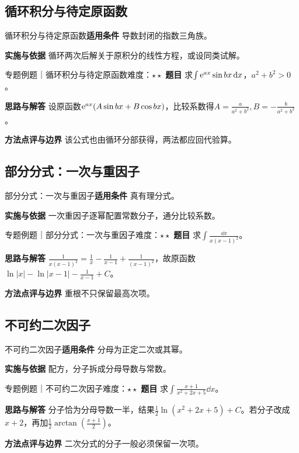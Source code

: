\subsection{循环积分与待定原函数}\label{mat:integrals_methods:i07}
\begin{method}{循环积分与待定原函数}\textbf{适用条件} 导数封闭的指数三角族。\par\textbf{实施与依据} 循环两次后解关于原积分的线性方程，或设同类试解。\end{method}
\begin{example}{专题例题｜循环积分与待定原函数}{难度：$\star\star$}
\textbf{题目} 求$\int\mathrm{e}^{ax}\sin bx\mathop{}\!\mathrm{d} x$，$a^2+b^2>0$。\par\textbf{思路与解答} 设原函数$\mathrm{e}^{ax}(A\sin bx+B\cos bx)$，比较系数得$A=\frac{a}{a^2+b^2},B=-\frac{b}{a^2+b^2}$。\par\textbf{方法点评与边界} 该公式也由循环分部获得，两法都应回代验算。
\end{example}
\subsection{部分分式：一次与重因子}\label{mat:integrals_methods:i08}
\begin{method}{部分分式：一次与重因子}\textbf{适用条件} 真有理分式。\par\textbf{实施与依据} 一次重因子逐幂配置常数分子，通分比较系数。\end{method}
\begin{example}{专题例题｜部分分式：一次与重因子}{难度：$\star\star$}
\textbf{题目} 求$\int\frac{\dd x}{x(x-1)^2}$。\par\textbf{思路与解答} $\frac{1}{x(x-1)^2}=\frac{1}{x}-\frac{1}{x-1}+\frac{1}{(x-1)^2}$，故原函数$\ln|x|-\ln|x-1|-\frac{1}{x-1}+C$。\par\textbf{方法点评与边界} 重根不只保留最高次项。
\end{example}
\subsection{不可约二次因子}\label{mat:integrals_methods:i09}
\begin{method}{不可约二次因子}\textbf{适用条件} 分母为正定二次或其幂。\par\textbf{实施与依据} 配方，分子拆成分母导数与常数。\end{method}
\begin{example}{专题例题｜不可约二次因子}{难度：$\star\star$}
\textbf{题目} 求$\int\frac{x+1}{x^2+2x+5}\dd x$。\par\textbf{思路与解答} 分子恰为分母导数一半，结果$\frac12\ln(x^2+2x+5)+C$。若分子改成$x+2$，再加$\frac12\arctan(\frac{x+1}{2})$。\par\textbf{方法点评与边界} 二次分式的分子一般必须保留一次项。
\end{example}
